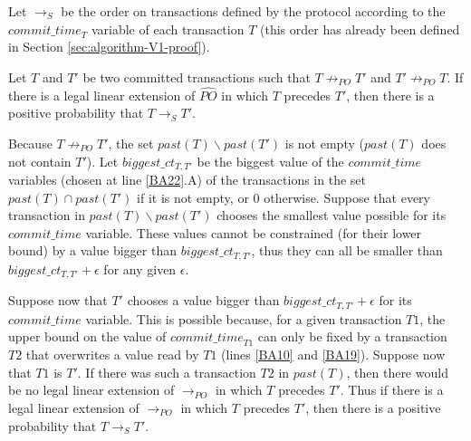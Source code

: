 Let $\rightarrow_{S}$ be the order on transactions defined by the protocol
according to the $\mathit{commit\_time}_T$ variable of each transaction $T$
(this order has already been defined in Section \ref{sec:algorithm-V1-proof}).

\begin{lemma}
\label{lemma:proba-order}
Let $T$ and $T'$ be two committed transactions 
such that $T \not\rightarrow_{PO} T'$ and
$T' \not\rightarrow_{PO} T$. If there is a legal linear extension of 
$\widehat{PO}$ in which $T$ precedes $T'$, then
there is a positive probability that $T \rightarrow_S T'$.
\end{lemma}
\begin{proofL}
Because $T \not\rightarrow_{PO} T'$,
the set $past(T) \backslash past(T')$ is not empty
($past(T)$ does not contain $T'$).
Let    $biggest\_ct_{T,T'}$     be    the    biggest     value    of    the
$\mathit{commit\_time}$ variables (chosen at line \ref{BA22}.A) of the  
transactions in the set $past(T) \cap past(T')$ if it is not empty, or $0$ 
otherwise. Suppose that every transaction in $past(T) \backslash past(T')$ 
chooses the smallest value possible for its $\mathit{commit\_time}$ 
variable.
These values cannot be  constrained (for their lower bound) 
 by a value bigger than $biggest\_ct_{T,T'}$, 
thus they can all be smaller
than $biggest\_ct_{T,T'} + \epsilon$ for any given $\epsilon$.

Suppose now  that $T'$
chooses a  value bigger than $biggest\_ct_{T,T'} + \epsilon$ for its 
$\mathit{commit\_time}$ variable.
This is possible because, for a given transaction $T1$, 
the upper bound on 
the value of $\mathit{commit\_time}_{T1}$ can only be fixed by 
a transaction $T2$ that overwrites 
a value read by $T1$ (lines \ref{BA10} and \ref{BA19}).
Suppose now that $T1$ is $T'$.
If there was such a transaction $T2$ in $past(T)$, 
then there would be no legal linear extension of 
$\rightarrow_{PO}$ in which $T$ precedes $T'$. 
Thus if there is a legal linear extension of 
$\rightarrow_{PO}$ in which $T$ precedes $T'$, then
there is a positive probability that $T \rightarrow_S T'$.
\renewcommand{\toto}{lemma:proba-order}
\end{proofL}


